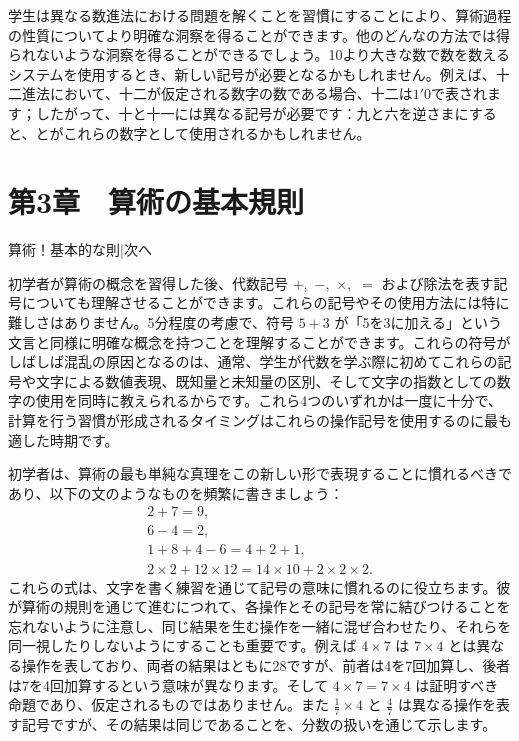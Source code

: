 \documentclass[a4paper,11pt,openany]{ltjsbook}
\begin{document}
学生は異なる数進法における問題を解くことを習慣にすることにより、算術過程の性質についてより明確な洞察を得ることができます。他のどんなの方法では得られないような洞察を得ることができるでしょう。10より大きな数で数を数えるシステムを使用するとき、新しい記号が必要となるかもしれません。例えば、十二進法において、十二が仮定される数字の数である場合、十二は$1'0$で表されます；したがって、十と十一には異なる記号が必要です：九と六を逆さまにすると、とがこれらの数字として使用されるかもしれません。

\chapter{第3章　算術の基本規則}

算術！基本的な則|次へ

初学者が算術の概念を習得した後、代数記号 $+$,~$-$,~$×$,~$=$ および除法を表す記号についても理解させることができます。これらの記号やその使用方法には特に難しさはありません。5分程度の考慮で、符号 $5 + 3$ が「5を3に加える」という文言と同様に明確な概念を持つことを理解することができます。これらの符号がしばしば混乱の原因となるのは、通常、学生が代数を学ぶ際に初めてこれらの記号や文字による数値表現、既知量と未知量の区別、そして文字の指数としての数字の使用を同時に教えられるからです。これら4つのいずれかは一度に十分で、計算を行う習慣が形成されるタイミングはこれらの操作記号を使用するのに最も適した時期です。

初学者は、算術の最も単純な真理をこの新しい形で表現することに慣れるべきであり、以下の文のようなものを頻繁に書きましょう：
\begin{gather*}
2 + 7 = 9, \\
6 - 4 = 2, \\
1 + 8 + 4 - 6 = 4 + 2 + 1, \\
2 × 2 + 12 × 12 = 14 × 10 + 2 × 2 × 2.
\end{gather*}
これらの式は、文字を書く練習を通じて記号の意味に慣れるのに役立ちます。彼が算術の規則を通じて進むにつれて、各操作とその記号を常に結びつけることを忘れないように注意し、同じ結果を生む操作を一緒に混ぜ合わせたり、それらを同一視したりしないようにすることも重要です。例えば $4 × 7$ は $7 × 4$ とは異なる操作を表しており、両者の結果はともに28ですが、前者は4を7回加算し、後者は7を4回加算するという意味が異なります。そして $4 × 7 = 7 × 4$ は証明すべき命題であり、仮定されるものではありません。また $\frac{1}{7} × 4$ と $\frac{4}{7}$ は異なる操作を表す記号ですが、その結果は同じであることを、分数の扱いを通じて示します。
\end{document}
